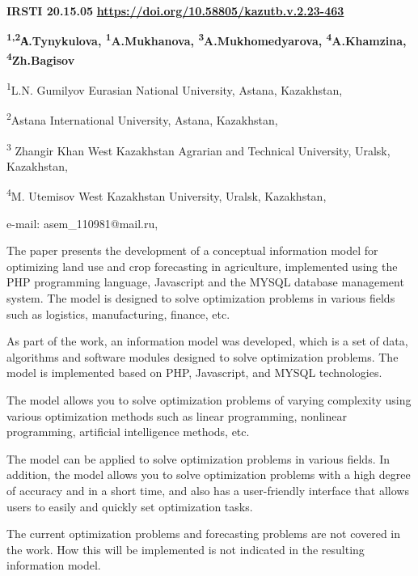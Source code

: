 \newpage
{\bfseries IRSTI 20.15.05}
\hfill {\bfseries \href{https://doi.org/10.58805/kazutb.v.2.23-463}{https://doi.org/10.58805/kazutb.v.2.23-463}}


\begin{center}
{\bfseries \textsuperscript{1,2}А.Tynykulova, \textsuperscript{1}A.Mukhanova, \textsuperscript{3}A.Mukhomedyarova, \textsuperscript{4}A.Khamzina, \textsuperscript{4}Zh.Bagisov}

\textsuperscript{1}L.N. Gumilyov Eurasian National University, Astana,
Kazakhstan,

\textsuperscript{2}Astana International University, Astana, Kazakhstan,

\textsuperscript{3} Zhangir Khan West Kazakhstan Agrarian and Technical
University, Uralsk, Kazakhstan,

\textsuperscript{4}M. Utemisov West Kazakhstan University, Uralsk,
Kazakhstan,

e-mail: asem\_110981@mail.ru,
\end{center}

The paper presents the development of a conceptual information model for
optimizing land use and crop forecasting in agriculture, implemented
using the PHP programming language, Javascript and the MYSQL database
management system. The model is designed to solve optimization problems
in various fields such as logistics, manufacturing, finance, etc.

As part of the work, an information model was developed, which is a set
of data, algorithms and software modules designed to solve optimization
problems. The model is implemented based on PHP, Javascript, and MYSQL
technologies.

The model allows you to solve optimization problems of varying
complexity using various optimization methods such as linear
programming, nonlinear programming, artificial intelligence methods,
etc.

The model can be applied to solve optimization problems in various
fields. In addition, the model allows you to solve optimization problems
with a high degree of accuracy and in a short time, and also has a
user-friendly interface that allows users to easily and quickly set
optimization tasks.

The current optimization problems and forecasting problems are not
covered in the work. How this will be implemented is not indicated in
the resulting information model.

